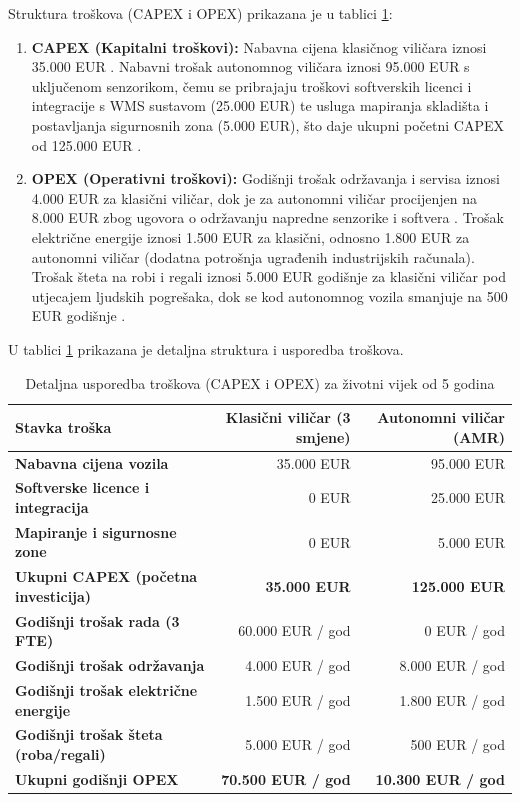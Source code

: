 \documentclass[12pt,a4paper]{article}
\begin{document}
Struktura troškova (CAPEX i OPEX) prikazana je u tablici \ref{tab:tco_detaljno}:
\begin{enumerate}
    \item \textbf{CAPEX (Kapitalni troškovi):} Nabavna cijena klasičnog viličara iznosi 35.000 EUR \cite{toyota, jungheinrich}. Nabavni trošak autonomnog viličara iznosi 95.000 EUR s uključenom senzorikom, čemu se pribrajaju troškovi softverskih licenci i integracije s WMS sustavom (25.000 EUR) te usluga mapiranja skladišta i postavljanja sigurnosnih zona (5.000 EUR), što daje ukupni početni CAPEX od 125.000 EUR \cite{toyota, jungheinrich}.
    \item \textbf{OPEX (Operativni troškovi):} Godišnji trošak održavanja i servisa iznosi 4.000 EUR za klasični viličar, dok je za autonomni viličar procijenjen na 8.000 EUR zbog ugovora o održavanju napredne senzorike i softvera \cite{toyota, jungheinrich}. Trošak električne energije iznosi 1.500 EUR za klasični, odnosno 1.800 EUR za autonomni viličar (dodatna potrošnja ugrađenih industrijskih računala). Trošak šteta na robi i regali iznosi 5.000 EUR godišnje za klasični viličar pod utjecajem ljudskih pogrešaka, dok se kod autonomnog vozila smanjuje na 500 EUR godišnje \cite{bowersox}.
\end{enumerate}

U tablici \ref{tab:tco_detaljno} prikazana je detaljna struktura i usporedba troškova.

\begin{table}[h]
\centering
\caption{Detaljna usporedba troškova (CAPEX i OPEX) za životni vijek od 5 godina}
\label{tab:tco_detaljno}
\begin{tabularx}{\textwidth}{|l|r|r|}
\hline
\textbf{Stavka troška} & \textbf{Klasični viličar (3 smjene)} & \textbf{Autonomni viličar (AMR)} \\ \hline
\textbf{Nabavna cijena vozila} & 35.000 EUR & 95.000 EUR \\ \hline
\textbf{Softverske licence i integracija} & 0 EUR & 25.000 EUR \\ \hline
\textbf{Mapiranje i sigurnosne zone} & 0 EUR & 5.000 EUR \\ \hline
\textbf{Ukupni CAPEX (početna investicija)} & \textbf{35.000 EUR} & \textbf{125.000 EUR} \\ \hline
\textbf{Godišnji trošak rada (3 FTE)} & 60.000 EUR / god & 0 EUR / god \\ \hline
\textbf{Godišnji trošak održavanja} & 4.000 EUR / god & 8.000 EUR / god \\ \hline
\textbf{Godišnji trošak električne energije} & 1.500 EUR / god & 1.800 EUR / god \\ \hline
\textbf{Godišnji trošak šteta (roba/regali)} & 5.000 EUR / god & 500 EUR / god \\ \hline
\textbf{Ukupni godišnji OPEX} & \textbf{70.500 EUR / god} & \textbf{10.300 EUR / god} \\ \hline
\end{tabularx}
\end{table}
\end{document}
